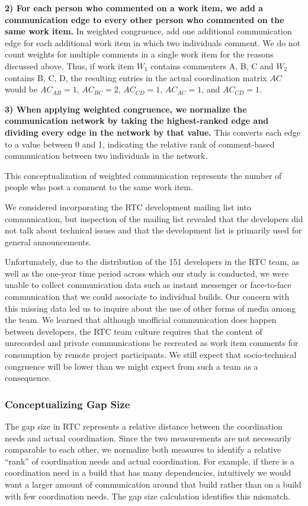 \documentclass[12pt,oneside]{book}
\begin{document}
\textbf{2) For each person who commented on a work item, we add a communication edge to every other person who commented on the same work item.} In weighted congruence, add one additional communication edge for each additional work item in which two individuals comment. We do not count weights for multiple comments in a single work item for the reasons discussed above. Thus, if work item $W_1$ contains commenters {A, B, C} and $W_2$ contains {B, C, D}, the resulting entries in the actual coordination matrix $AC$ would be $AC_{AB}=1$, $AC_{BC}=2$, $AC_{CD}=1$, $AC_{AC}=1$, and $AC_{CD}=1$.

\textbf{3) When applying weighted congruence, we normalize the communication network by taking the highest-ranked edge and dividing every edge in the network by that value.} This converts each edge to a value between 0 and 1, indicating the relative rank of comment-based communication between two individuals in the network.

This conceptualization of weighted communication represents the number of people who post a comment to the same work item.

We considered incorporating the RTC development mailing list into communication, but inspection of the mailing list revealed that the developers did not talk about technical issues and that the development list is primarily used for general announcements.

Unfortunately, due to the distribution of the 151 developers in the RTC team, as well as the one-year time period across which our study is conducted, we were unable to collect communication data such as instant messenger or face-to-face communication that we could associate to individual builds. Our concern with this missing data led us to inquire about the use of other forms of media among the team. We learned that although unofficial communication does happen between developers, the RTC team culture requires that the content of unrecorded and private communications be recreated as work item comments for consumption by remote project participants. We still expect that socio-technical congruence will be lower than we might expect from such a team as a consequence.

\subsubsection{Conceptualizing Gap Size}

The gap size in RTC represents a relative distance between the coordination needs and actual coordination. Since the two measurements are not necessarily comparable to each other, we normalize both measures to identify a relative ``rank'' of coordination needs and actual coordination. For example, if there is a coordination need in a build that has many dependencies, intuitively we would want a larger amount of communication around that build rather than on a build with few coordination needs. The gap size calculation identifies this mismatch.
\end{document}
